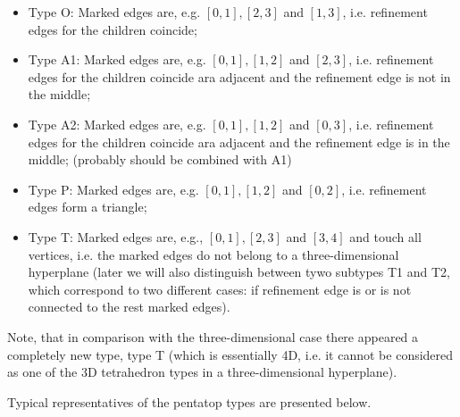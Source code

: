 \documentclass[a4paper,12pt]{amsart}
\numberwithin{equation}{section}
\begin{document}
\begin{itemize}
	\item Type O: Marked edges are, e.g. $[0,1], [2,3]$ and $[1,3]$, i.e. refinement edges for the children coincide;
	\item Type A1: Marked edges are, e.g. $[0,1], [1,2]$ and $[2,3]$, i.e. refinement edges for the children coincide ara adjacent and the refinement edge is not in the middle;
	\item Type A2: Marked edges are, e.g. $[0,1], [1,2]$ and $[0,3]$, i.e. refinement edges for the children coincide ara adjacent and the refinement edge is in the middle; (probably should be combined with A1)
	\item Type P: Marked edges are, e.g. $[0,1], [1,2]$ and $[0,2]$, i.e. refinement edges form a triangle;
	\item Type T: Marked edges are, e.g., $[0,1], [2,3]$ and $[3,4]$ and  touch all vertices, i.e. the marked edges do not belong to a three-dimensional hyperplane (later we will also distinguish between tywo subtypes T1 and T2, which correspond to two different cases: if refinement edge is or is not connected to the rest marked edges).
\end{itemize}

Note, that in comparison with the three-dimensional case there appeared a completely new type, type T (which is essentially 4D, i.e. it cannot be considered as one of the 3D tetrahedron types in a three-dimensional hyperplane).

Typical representatives of the pentatop types are presented below.
\end{document}
